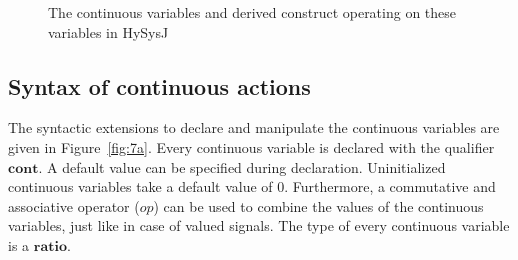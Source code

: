 \documentclass[10pt,journal,cspaper,compsoc]{IEEEtran}
\begin{document}
\begin{figure}[t!]
  \centering
  
  \subfloat[The rewrite for the derived construct:
  \mbox{$\mathbf{do}\ \{a' = \rho\} \mathbf{until} (expr)\}$}.] {
    \usebox\rgone \label{fig:7c}}
  \hspace{30pt}
  \subfloat[The rewrite for the derived construct:
  \mbox{$\mathbf{do}\ \{a' = \rho || b' = \sigma \} \mathbf{until}
    (expr)\}$}.] {
    \usebox\rgtwo \label{fig:7b}}
  \caption{The continuous variables and derived construct operating on
    these variables in HySysJ}
  \label{fig:7}
\end{figure}

\subsection{Syntax of continuous actions}
\label{sec:synt-cont-acti}

The syntactic extensions to declare and manipulate the continuous
variables are given in Figure~\ref{fig:7a}. Every continuous variable is
declared with the qualifier $\mathbf{cont}$. A default value can be
specified during declaration. Uninitialized continuous variables take a
default value of 0. Furthermore, a commutative and associative operator
($op$) can be used to combine the values of the continuous variables,
just like in case of valued signals. The type of every continuous
variable is a $\mathbf{ratio}$.
\end{document}
